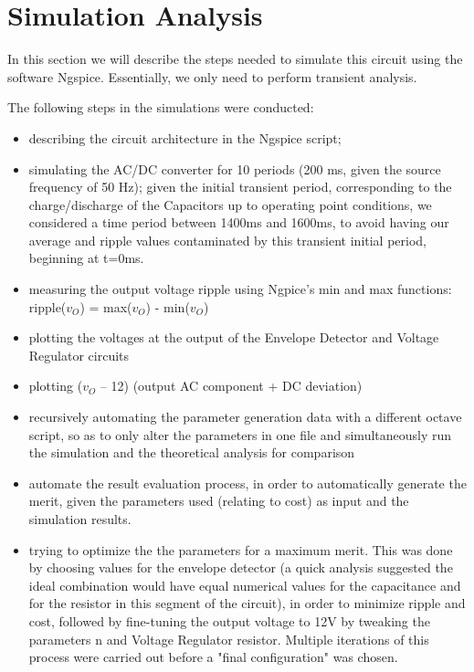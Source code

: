 \section{Simulation Analysis}
\label{sec:simulation}
In this section we will describe the steps needed to simulate this circuit using the software Ngspice. Essentially, we only need to perform transient analysis.

The following steps in the simulations were conducted: 
\begin{itemize}
	\item describing the circuit architecture in the Ngspice script;
	\item simulating the AC/DC converter for 10 periods (200 ms, given the source frequency of 50 Hz); given the initial transient period, corresponding to the charge/discharge of the Capacitors up to operating point conditions, we considered a time period between 1400ms and 1600ms, to avoid having our average and ripple values contaminated by this transient initial period, beginning at t=0ms.
	\item measuring the output voltage ripple using Ngpice’s min and
max functions: ripple($v_O$) = max($v_O$) - min($v_O$)
	\item plotting the voltages at the output of the Envelope Detector
and Voltage Regulator circuits
	\item plotting ($v_O$ – 12) (output AC component + DC deviation)
	\item recursively automating the parameter generation data with a different octave script, so as to only alter the parameters in one file and simultaneously run the simulation and the theoretical analysis for comparison
	\item automate the result evaluation process, in order to automatically generate the merit, given the parameters used (relating to cost) as input and the simulation results.
	\item trying to optimize the the parameters for a maximum merit. This was done by choosing values for the envelope detector (a quick analysis suggested the ideal combination would have equal numerical values for the capacitance and for the resistor in this segment of the circuit), in order to minimize ripple and cost, followed by fine-tuning the output voltage to 12V by tweaking the parameters n and Voltage Regulator resistor. Multiple iterations of this process were carried out before a "final configuration" was chosen.
	

\end{itemize}


